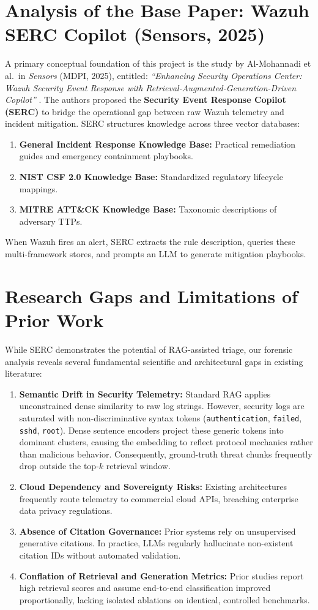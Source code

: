 \section{Analysis of the Base Paper: Wazuh SERC Copilot (Sensors, 2025)}
\label{sec:lit_base_paper}
A primary conceptual foundation of this project is the study by Al-Mohannadi et al.\ in \emph{Sensors} (MDPI, 2025), entitled: \emph{``Enhancing Security Operations Center: Wazuh Security Event Response with Retrieval-Augmented-Generation-Driven Copilot''} \cite{sensors2025wazuhcopilot}. The authors proposed the \textbf{Security Event Response Copilot (SERC)} to bridge the operational gap between raw Wazuh telemetry and incident mitigation. SERC structures knowledge across three vector databases:
\begin{enumerate}
  \item \textbf{General Incident Response Knowledge Base:} Practical remediation guides and emergency containment playbooks.
  \item \textbf{NIST CSF 2.0 Knowledge Base:} Standardized regulatory lifecycle mappings.
  \item \textbf{MITRE ATT\&CK Knowledge Base:} Taxonomic descriptions of adversary TTPs.
\end{enumerate}
When Wazuh fires an alert, SERC extracts the rule description, queries these multi-framework stores, and prompts an LLM to generate mitigation playbooks.

\section{Research Gaps and Limitations of Prior Work}
\label{sec:lit_gaps}
While SERC \cite{sensors2025wazuhcopilot} demonstrates the potential of RAG-assisted triage, our forensic analysis reveals several fundamental scientific and architectural gaps in existing literature:
\begin{enumerate}
  \item \textbf{Semantic Drift in Security Telemetry:} Standard RAG applies unconstrained dense similarity to raw log strings. However, security logs are saturated with non-discriminative syntax tokens (\texttt{authentication}, \texttt{failed}, \texttt{sshd}, \texttt{root}). Dense sentence encoders project these generic tokens into dominant clusters, causing the embedding to reflect protocol mechanics rather than malicious behavior. Consequently, ground-truth threat chunks frequently drop outside the top-$k$ retrieval window.
  \item \textbf{Cloud Dependency and Sovereignty Risks:} Existing architectures frequently route telemetry to commercial cloud APIs, breaching enterprise data privacy regulations.
  \item \textbf{Absence of Citation Governance:} Prior systems rely on unsupervised generative citations. In practice, LLMs regularly hallucinate non-existent citation IDs without automated validation.
  \item \textbf{Conflation of Retrieval and Generation Metrics:} Prior studies report high retrieval scores and assume end-to-end classification improved proportionally, lacking isolated ablations on identical, controlled benchmarks.
\end{enumerate}

